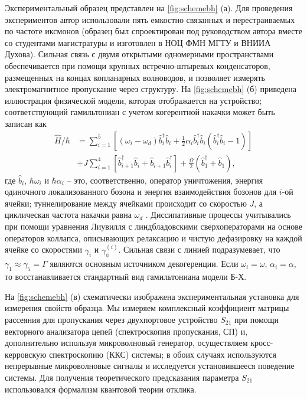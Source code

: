 \documentclass[14pt, a4paper]{extarticle}
\begin{document}
Экспериментальный образец представлен на \autoref{fig:schemebh} (а). Для проведения экспериментов автор использовали пять емкостно связанных и перестраиваемых по частоте иксмонов (образец был спроектирован под руководством автора вместе со студентами магистратуры и изготовлен в НОЦ ФМН МГТУ и ВНИИА Духова). Сильная связь с двумя открытыми одномерными пространствами обеспечивается при помощи крупных встречно-штыревых конденсаторов, размещенных на концах копланарных волноводов, и позволяет измерять электромагнитное пропускание через структуру. На \autoref{fig:schemebh} (б) приведена иллюстрация физической модели, которая отображается на устройство; соответствующий гамильтониан с учетом когерентной накачки может быть записан как
\begin{equation}
\begin{aligned}
\hat H/\hbar &= \sum_{i=1}^5\left[ (\omega_i - \omega_d) \hat b^\dag_i \hat b_i + \frac{1}{2} \alpha_i \hat b_i^\dag \hat b_i (\hat b^\dag_i \hat b_i - 1)\right]\\
&+J\sum_{i=1}^4 \left[\hat b^\dag_{i+1} \hat b_i + \hat b_{i+1} \hat b_i^\dag\right]+\frac{\Omega}{2}(\hat b_1^\dag + \hat b_1),
\end{aligned}\label{eq:bose-hubbard}
\end{equation} 
где $\hat b_i$, $\hbar \omega_i$ и $\hbar \alpha_i$ -- это, соответственно, оператор уничтожения, энергия одиночного локализованного бозона и энергия взаимодействия бозонов  для $i$-ой ячейки; туннелирование между ячейками происходит со скоростью $J$, а циклическая частота накачки равна $\omega_d$ . Диссипативные процессы учитывались при помощи уравнения Лиувилля с линдбладовскими сверхоператорами на основе операторов коллапса, описывающих релаксацию и чистую дефазировку на каждой ячейке со скоростями $\gamma_i$ и $\gamma_{\phi}^{(i)}$. Сильная связи с линией подразумевает, что $\gamma_1 \approx \gamma_5 = \Gamma$ являются основным источником декогеренции. Если $\omega_i = \omega$, $\alpha_i = \alpha$, то восстанавливается стандартный вид гамильтониана модели Б-Х.

На \autoref{fig:schemebh} (в) схематически изображена экспериментальная установка для измерения свойств образца. Мы измеряем комплексный коэффициент матрицы рассеяния для пропускания через двухпортовое устройство $S_{21}$ при помощи векторного анализатора цепей (спектроскопия пропускания, СП) и, дополнительно используя микроволновый генератор, осуществляем кросс-керровскую спектроскопию (ККС) системы; в обоих случаях используются непрерывные микроволновые сигналы и исследуется установившееся поведение системы. Для получения теоретического предсказания параметра $S_{21}$ использовался формализм квантовой теории отклика.
	
\end{document}
